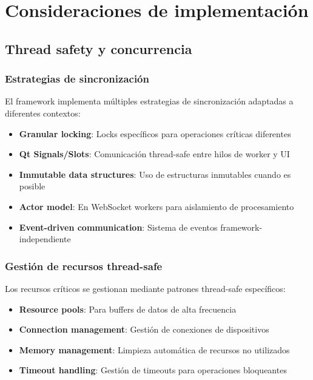 \section{Consideraciones de implementación}
\label{sec:consideraciones_implementacion}

\subsection{Thread safety y concurrencia}
\label{subsec:thread_safety}

\subsubsection{Estrategias de sincronización}

El framework implementa múltiples estrategias de sincronización adaptadas a diferentes contextos:

\begin{itemize}
    \item \textbf{Granular locking}: Locks específicos para operaciones críticas diferentes
    \item \textbf{Qt Signals/Slots}: Comunicación thread-safe entre hilos de worker y UI
    \item \textbf{Immutable data structures}: Uso de estructuras inmutables cuando es posible
    \item \textbf{Actor model}: En WebSocket workers para aislamiento de procesamiento
    \item \textbf{Event-driven communication}: Sistema de eventos framework-independiente
\end{itemize}

\subsubsection{Gestión de recursos thread-safe}

Los recursos críticos se gestionan mediante patrones thread-safe específicos:
\begin{itemize}
    \item \textbf{Resource pools}: Para buffers de datos de alta frecuencia
    \item \textbf{Connection management}: Gestión de conexiones de dispositivos
    \item \textbf{Memory management}: Limpieza automática de recursos no utilizados
    \item \textbf{Timeout handling}: Gestión de timeouts para operaciones bloqueantes
\end{itemize}

